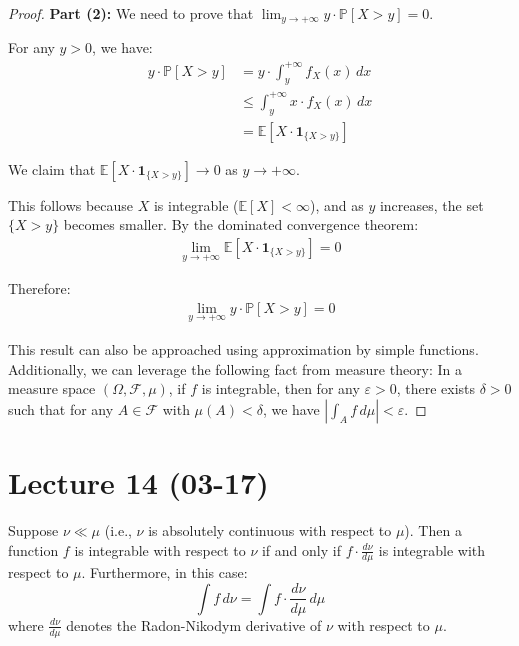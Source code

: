 \begin{proof}
        \textbf{Part (2):} We need to prove that $\lim_{y \to +\infty} y \cdot \mathbb{P}[X > y] = 0$.
        
        For any $y > 0$, we have:
        \begin{align*}
        y \cdot \mathbb{P}[X > y] &= y \cdot \int_y^{+\infty} f_X(x) \, dx\\
        &\leq \int_y^{+\infty} x \cdot f_X(x) \, dx\\
        &= \mathbb{E}[X \cdot \mathbf{1}_{\{X > y\}}]
        \end{align*}
        
        We claim that $\mathbb{E}[X \cdot \mathbf{1}_{\{X > y\}}] \to 0$ as $y \to +\infty$.
        
        This follows because $X$ is integrable ($\mathbb{E}[X] < \infty$), and as $y$ increases, the set $\{X > y\}$ becomes smaller. By the dominated convergence theorem:
        \begin{align*}
        \lim_{y \to +\infty} \mathbb{E}[X \cdot \mathbf{1}_{\{X > y\}}] = 0
        \end{align*}
        
        Therefore:
        \begin{align*}
        \lim_{y \to +\infty} y \cdot \mathbb{P}[X > y] = 0
        \end{align*}
        
        This result can also be approached using approximation by simple functions. Additionally, we can leverage the following fact from measure theory: In a measure space $(\Omega, \mathcal{F}, \mu)$, if $f$ is integrable, then for any $\varepsilon > 0$, there exists $\delta > 0$ such that for any $A \in \mathcal{F}$ with $\mu(A) < \delta$, we have $\left|\int_A f \, d\mu\right| < \varepsilon$.
        \end{proof}
\section{Lecture 14 (03-17)}
\begin{theorem}{}
    Suppose $\nu \ll \mu$ (i.e., $\nu$ is absolutely continuous with respect to $\mu$). Then a function $f$ is integrable with respect to $\nu$ if and only if $f \cdot \frac{d\nu}{d\mu}$ is integrable with respect to $\mu$. Furthermore, in this case:
    \[
    \int f \, d\nu = \int f \cdot \frac{d\nu}{d\mu} \, d\mu
    \]
    where $\frac{d\nu}{d\mu}$ denotes the Radon-Nikodym derivative of $\nu$ with respect to $\mu$.
    \end{theorem}
    
